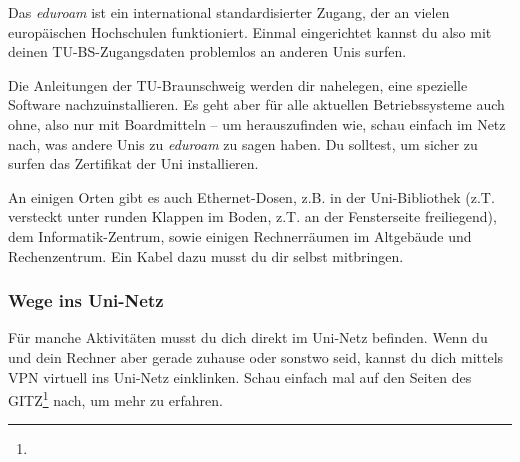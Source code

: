 		Das \emph{eduroam} ist ein international standardisierter Zugang, der an vielen europäischen Hochschulen funktioniert. Einmal eingerichtet kannst du also mit deinen TU-BS-Zugangsdaten problemlos an anderen Unis surfen.

		Die Anleitungen der TU-Braunschweig werden dir nahelegen, eine spezielle Software nachzuinstallieren. Es geht aber für alle aktuellen Betriebssysteme auch ohne, also nur mit Boardmitteln -- um herauszufinden wie, schau einfach im Netz nach, was andere Unis zu \emph{eduroam} zu sagen haben. Du solltest, um sicher zu surfen das Zertifikat der Uni installieren.

		An einigen Orten gibt es auch Ethernet-Dosen, z.B. in der Uni-Bibliothek (z.T. versteckt unter runden Klappen im Boden, z.T. an der Fensterseite freiliegend), dem Informatik-Zentrum, sowie einigen Rechnerräumen im Altgebäude und Rechenzentrum. Ein Kabel dazu musst du dir selbst mitbringen.

    \subsubsection{Wege ins Uni-Netz}
        Für manche Aktivitäten musst du dich direkt im Uni-Netz befinden. Wenn du und dein Rechner aber gerade zuhause oder sonstwo seid, kannst du dich mittels VPN virtuell ins Uni-Netz einklinken. Schau einfach mal auf den Seiten des GITZ\footnote{} nach, um mehr zu erfahren.
